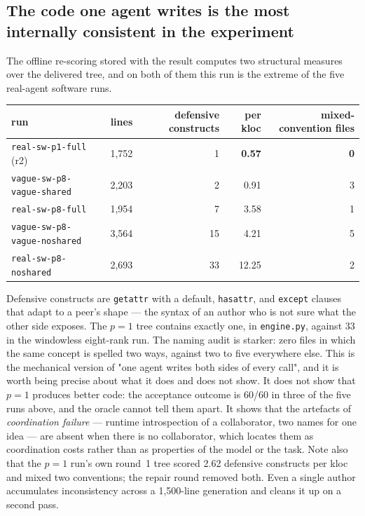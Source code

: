 \documentclass[11pt]{article}
\begin{document}
\subsection*{The code one agent writes is the most internally consistent in the experiment}

The offline re-scoring stored with the result computes two structural measures over the
delivered tree, and on both of them this run is the extreme of the five real-agent software
runs.

\begin{center}
\begin{tabular}{@{}lrrrr@{}}
\toprule
run & lines & defensive constructs & per kloc & mixed-convention files \\
\midrule
\texttt{real-sw-p1-full} (r2) & 1{,}752 & 1 & \textbf{0.57} & \textbf{0} \\
\texttt{vague-sw-p8-vague-shared} & 2{,}203 & 2 & 0.91 & 3 \\
\texttt{real-sw-p8-full} & 1{,}954 & 7 & 3.58 & 1 \\
\texttt{vague-sw-p8-vague-noshared} & 3{,}564 & 15 & 4.21 & 5 \\
\texttt{real-sw-p8-noshared} & 2{,}693 & 33 & 12.25 & 2 \\
\bottomrule
\end{tabular}
\end{center}

Defensive constructs are \texttt{getattr} with a default, \texttt{hasattr}, and
\texttt{except} clauses that adapt to a peer's shape --- the syntax of an author who is not
sure what the other side exposes. The $p=1$ tree contains exactly one, in \texttt{engine.py},
against 33 in the windowless eight-rank run. The naming audit is starker: zero files in which
the same concept is spelled two ways, against two to five everywhere else. This is the
mechanical version of "one agent writes both sides of every call", and it is worth being
precise about what it does and does not show. It does not show that $p=1$ produces better
code: the acceptance outcome is 60/60 in three of the five runs above, and the oracle cannot
tell them apart. It shows that the artefacts of \emph{coordination failure} --- runtime
introspection of a collaborator, two names for one idea --- are absent when there is no
collaborator, which locates them as coordination costs rather than as properties of the model
or the task. Note also that the $p=1$ run's own round~1 tree scored 2.62 defensive constructs
per kloc and mixed two conventions; the repair round removed both. Even a single author
accumulates inconsistency across a 1{,}500-line generation and cleans it up on a second pass.
\end{document}

